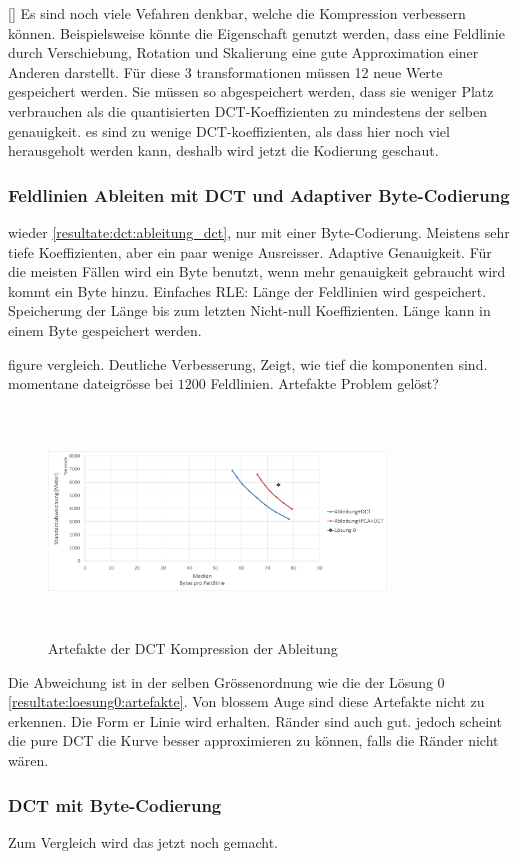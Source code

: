 [\baselineskip]
Es sind noch viele Vefahren denkbar, welche die Kompression verbessern können. Beispielsweise könnte die Eigenschaft genutzt werden, dass eine Feldlinie durch Verschiebung, Rotation und Skalierung eine gute Approximation einer Anderen darstellt. Für diese 3 transformationen müssen 12 neue Werte gespeichert werden. Sie müssen so abgespeichert werden, dass sie weniger Platz verbrauchen als die quantisierten DCT-Koeffizienten zu mindestens der selben genauigkeit. es sind zu wenige DCT-koeffizienten, als dass hier noch viel herausgeholt werden kann, deshalb wird jetzt die Kodierung geschaut.

\subsubsection{Feldlinien Ableiten mit DCT und Adaptiver Byte-Codierung}
wieder \ref{resultate:dct:ableitung_dct}, nur mit einer Byte-Codierung.
Meistens sehr tiefe Koeffizienten, aber ein paar wenige Ausreisser. Adaptive Genauigkeit. Für die meisten Fällen wird ein Byte benutzt, wenn mehr genauigkeit gebraucht wird kommt ein Byte hinzu.
Einfaches RLE: Länge der Feldlinien wird gespeichert. Speicherung der Länge bis zum letzten Nicht-null Koeffizienten. Länge kann in einem Byte gespeichert werden.

figure vergleich.
Deutliche Verbesserung, Zeigt, wie tief die komponenten sind. momentane dateigrösse bei $1200$ Feldlinien. Artefakte Problem gelöst?
\begin{figure}[!htbp]
	\center
	\includegraphics[width=0.8\textwidth,height=6cm,keepaspectratio]{./pictures/resultate/loesung1/loesung1-4/loesung1_4.png}
	\caption{Artefakte der DCT Kompression der Ableitung}
	\label{resultate:loesung1:dct:byte:artefakte:}
\end{figure} 
Die Abweichung ist in der selben Grössenordnung wie die der Lösung 0 \ref{resultate:loesung0:artefakte}. Von blossem Auge sind diese Artefakte nicht zu erkennen. Die Form er Linie wird erhalten. Ränder sind auch gut. jedoch scheint die pure DCT die Kurve besser approximieren zu können, falls die Ränder nicht wären.

\subsubsection{DCT mit Byte-Codierung}
Zum Vergleich wird das jetzt noch gemacht.

